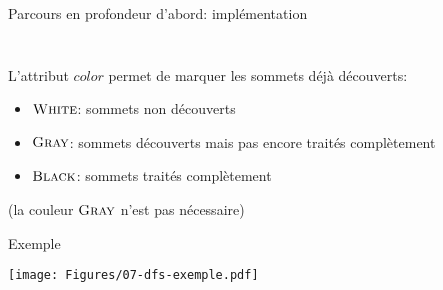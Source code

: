 \begin{frame}{Parcours en profondeur d'abord: implémentation}

\begin{columns}
\begin{column}{5cm}
\begin{center}
{\small
{}
}
\end{center}
\end{column}
\begin{column}{5cm}
\begin{center}
{\small
{}
}
\end{center}
\end{column}
\end{columns}

\bigskip

L'attribut $color$ permet de marquer les sommets déjà découverts:
\begin{itemize}
\item $\textnormal{\scshape White}$: sommets non découverts
\item $\textnormal{\scshape Gray}$: sommets découverts mais pas encore traités complètement
\item $\textnormal{\scshape Black}$: sommets traités complètement
\end{itemize}
(la couleur $\textnormal{\scshape Gray}$ n'est pas nécessaire)

\end{frame}

\begin{frame}{Exemple}

\centerline{\texttt{[image: Figures/07-dfs-exemple.pdf]}}

\end{frame}

